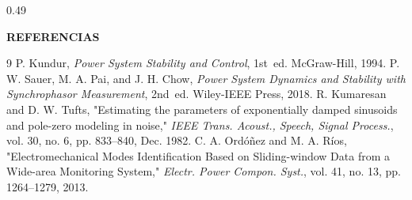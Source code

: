 \documentclass[final]{beamer}
\begin{document}
\begin{frame}[t]
\begin{columns}[t,totalwidth=\textwidth]
\begin{column}{0.49\textwidth}
    \begin{block}{\textbf{REFERENCIAS}}
    \begin{thebibliography}{9}\setlength{\itemsep}{2pt}
       P. Kundur, \emph{Power System Stability and Control}, 1st~ed. McGraw-Hill, 1994.
       P. W. Sauer, M. A. Pai, and J. H. Chow, \emph{Power System Dynamics and Stability with Synchrophasor Measurement}, 2nd~ed. Wiley-IEEE Press, 2018.
       R. Kumaresan and D. W. Tufts, "Estimating the parameters of exponentially damped sinusoids and pole-zero modeling in noise," \emph{IEEE Trans. Acoust., Speech, Signal Process.}, vol. 30, no. 6, pp. 833–840, Dec. 1982.
       C. A. Ordóñez and M. A. Ríos, "Electromechanical Modes Identification Based on Sliding-window Data from a Wide-area Monitoring System," \emph{Electr. Power Compon. Syst.}, vol. 41, no. 13, pp. 1264–1279, 2013.
    \end{thebibliography}
    \end{block}
  \end{column}
\end{columns}

\end{frame}
\end{document}

